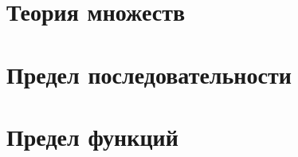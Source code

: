 




    \graphicspath{{images/}}
    
    \newpage
    \hypertarget{intro}{}
    \tableofcontents

    \linespread{1}
    \selectfont
    \newpage

    \section{Теория множеств}
    
    
    
    
    
    
    
    \section{Предел последовательности}
    
    
    
    
    
    
    

    \section{Предел функций}
    
    
